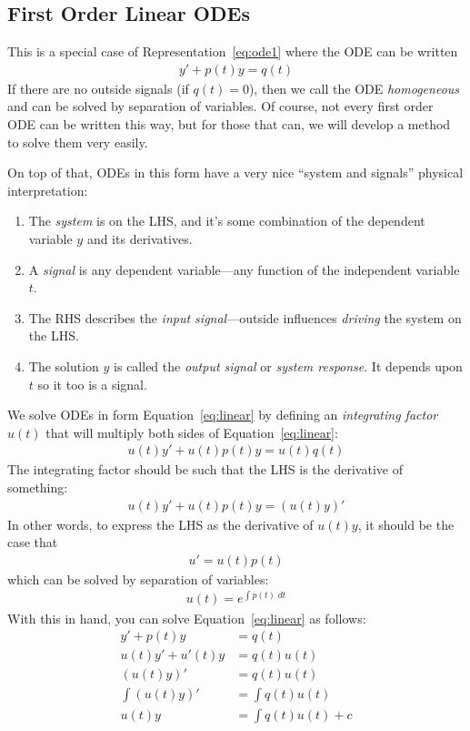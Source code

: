 \documentclass[12pt]{article}
\theoremstyle{plain}
\theoremstyle{definition}
\theoremstyle{remark}
\begin{document}
\clearpage
\subsection{First Order Linear ODEs}

This is a special case of Representation~\ref{eq:ode1} where the ODE can
be written
\begin{align}
  y' + p(t) y = q(t)
  \label{eq:linear}
\end{align}
If there are no outside signals (if $q(t)=0$), then we call the ODE
\emph{homogeneous} and can be solved by separation of variables.  Of
course, not every first order ODE can be written this way, but for those
that can, we will develop a method to solve them very easily.

On top of that, ODEs in this form have a very nice ``system and
signals'' physical interpretation:
\begin{enumerate}
  \item The \emph{system} is on the LHS, and it's some combination of
    the dependent variable $y$ and its derivatives.
  \item A \emph{signal} is any dependent variable---any function of the
    independent variable $t$.
  \item The RHS describes the \emph{input signal}---outside influences
    \emph{driving} the system on the LHS.
  \item The solution $y$ is called the \emph{output signal} or
    \emph{system response}. It depends upon $t$ so it too is a signal.
\end{enumerate}

We solve ODEs in form Equation~\ref{eq:linear} by defining an
\emph{integrating factor} $u(t)$ that will multiply both sides of
Equation~\ref{eq:linear}:
\begin{align*}
  u(t) y' + u(t)p(t) y = u(t) q(t)
\end{align*}
The integrating factor should be such that the LHS is the derivative of
something:
\begin{align*}
  u(t) y' + u(t) p(t) y = \left( u(t) y\right)'
\end{align*}
In other words, to express the LHS as the derivative of $u(t)y$, it
should be the case that
\begin{align*}
  u' = u(t) p(t)
\end{align*}
which can be solved by separation of variables:
\begin{align*}
  u(t) = e^{\int p(t) \; dt}
\end{align*}
With this in hand, you can solve Equation~\ref{eq:linear} as follows:
\begin{align*}
  y' + p(t) y &= q(t) \\
  u(t) y' + u'(t) y &= q(t)u(t)\\
  \left(u(t) y\right)' &= q(t)u(t) \\
  \int \left(u(t) y\right)' &= \int q(t)u(t) \\
  u(t) y &= \int q(t)u(t) + c\\
\end{align*}
\end{document}
